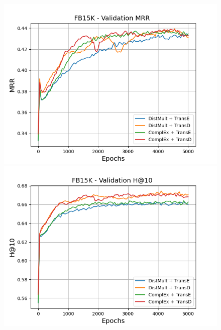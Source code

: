\begin{figure}
    \centering
    \begin{minipage}{.5\textwidth}
      \centering
      \includegraphics[width=\linewidth]{figures/results/gan_train/pretrained/random/fb15k/random_fb15k_mrrs.png}
    \end{minipage}%
    \begin{minipage}{.5\textwidth}
      \centering
      \includegraphics[width=\linewidth]{figures/results/gan_train/pretrained/random/fb15k/random_fb15k_hit10.png}
    \end{minipage}
    

\end{figure}
